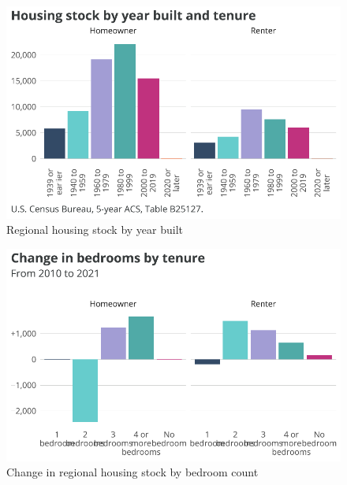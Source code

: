 \documentclass[
  letterpaper,
  DIV=11,
  numbers=noendperiod]{scrreprt}
\begin{document}
\begin{figure}[H]

{\centering \includegraphics{./part-3-1_files/figure-pdf/fig-yrbuilt-1.pdf}

}

\caption{\label{fig-yrbuilt}Regional housing stock by year built}

\end{figure}

\begin{figure}[H]

{\centering \includegraphics{./part-3-1_files/figure-pdf/fig-beds-1.pdf}

}

\caption{\label{fig-beds}Change in regional housing stock by bedroom
count}

\end{figure}
\end{document}
